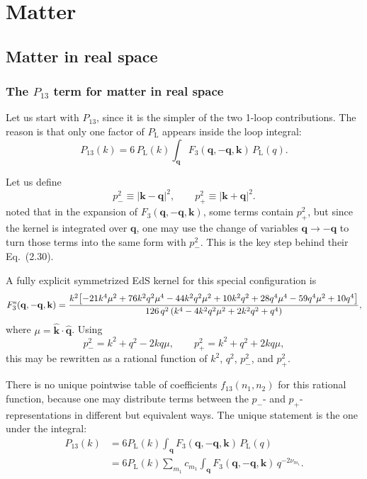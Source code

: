 \documentclass[a4paper,11pt]{article}
\def\Plin{P_{\rm L}}
\newcommand{\<}{\langle}
\renewcommand{\>}{\rangle}
\def\Plin{P_\text{L}}
\begin{document}
\section{Matter}

\subsection{Matter in real space}

\subsubsection{The \(P_{13}\) term for matter in real space}

Let us start with \(P_{13}\), since it is the simpler of the two 1-loop contributions. The reason is that only one factor of \(\Plin\) appears inside the loop integral:
\begin{equation}
P_{13}(k)
=
6\,\Plin(k)
\int_{\mathbf q}
F_3(\mathbf q,-\mathbf q,\mathbf k)\,
\Plin(q).
\end{equation}

Let us define
\begin{equation}
p_-^2\equiv |\mathbf k-\mathbf q|^2,
\qquad
p_+^2\equiv |\mathbf k+\mathbf q|^2.
\label{eq:p_pm}
\end{equation}
\cite{Simonovic:2017mhp} noted that in the expansion of \(F_3(\mathbf q,-\mathbf q,\mathbf k)\), some terms contain \(p_+^2\), but since the kernel is integrated over \(\mathbf q\), one may use the change of variables \(\mathbf q\to-\mathbf q\) to turn those terms into the same form with \(p_-^2\). This is the key step behind their Eq.~(2.30).

A fully explicit symmetrized EdS kernel for this special configuration is
\begin{equation}
F_3^{\rm s}(\mathbf q,-\mathbf q,\mathbf k)
=
\frac{k^2\!\left[
-21 k^4\mu^2
+76 k^2 q^2\mu^4
-44 k^2 q^2\mu^2
+10 k^2 q^2
+28 q^4\mu^4
-59 q^4\mu^2
+10 q^4
\right]}
{126\,q^2\left(k^4-4k^2 q^2\mu^2+2k^2 q^2+q^4\right)},
\end{equation}
where \(\mu=\hat{\mathbf k}\cdot\hat{\mathbf q}\).
Using
\[
p_-^2 = k^2+q^2-2kq\mu,
\qquad
p_+^2 = k^2+q^2+2kq\mu,
\]
this may be rewritten as a rational function of \(k^2\), \(q^2\), \(p_-^2\), and \(p_+^2\).

There is no unique pointwise table of coefficients \(f_{13}(n_1,n_2)\) for this rational function, because one may distribute terms between the \(p_-\)- and \(p_+\)-representations in different but equivalent ways. The unique statement is the one under the integral:
\begin{align}
P_{13}(k)
&=
6 \Plin(k)\int_{\mathbf q}F_3(\mathbf q,-\mathbf q,\mathbf k)\,\Plin(q)
\nonumber\\
&=
6 \Plin(k)
\sum_{m_1} c_{m_1}
\int_{\mathbf q}
F_3(\mathbf q,-\mathbf q,\mathbf k)\,q^{-2\nu_{m_1}}.
\label{eq:P13_FFTLog_decomp}
\end{align}
\end{document}
